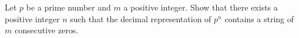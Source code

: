 Let $p$ be a prime number and $m$ a positive integer. Show that there exists a positive integer $n$ such that the decimal representation of $p^n$ contains a string of $m$ consecutive zeros.